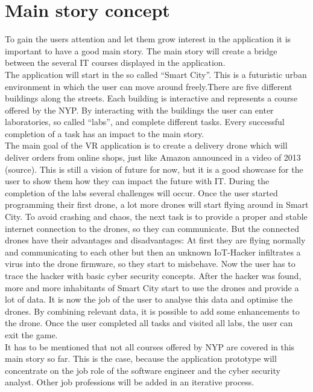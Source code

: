 \section{Main story concept}
To gain the users attention and let them grow interest in the application it is important to have a good main story. The main story will create a bridge between the several IT courses displayed in the application.\\
The application will start in the so called ``Smart City''. This is a futuristic urban environment in which the user can move around freely.There are five different buildings along the streets. Each building is interactive and represents a course offered by the NYP. By interacting with the buildings the user can enter laboratories, so called ``labs'', and complete different tasks. Every successful completion of a task has an impact to the main story. \\
The main goal of the VR application is to create a delivery drone which will deliver orders from online shops, just like Amazon announced in a video of 2013 (source). This is still a vision of future for now, but it is a good showcase for the user to show them how they can impact the future with IT. During the completion of the labs several challenges will occur. Once the user started programming their first drone, a lot more drones will start flying around in Smart City. To avoid crashing and chaos, the next task is to provide a proper and stable internet connection to the drones, so they can communicate. But the connected drones have their advantages and disadvantages: At first they are flying normally and communicating to each other but then an unknown IoT-Hacker infiltrates a virus into the drone firmware, so they start to misbehave. Now the user has to trace the hacker with basic cyber security concepts. After the hacker was found, more and more inhabitants of Smart City start to use the drones and provide a lot of data. It is now the job of the user to analyse this data and optimise the drones. By combining relevant data, it is possible to add some enhancements to the drone.
Once the user completed all tasks and visited all labs, the user can exit the game. \\
It has to be mentioned that not all courses offered by NYP are covered in this main story so far. This is the case, because the application prototype will concentrate on the job role of the software engineer and the cyber security analyst. Other job professions will be added in an iterative process.

